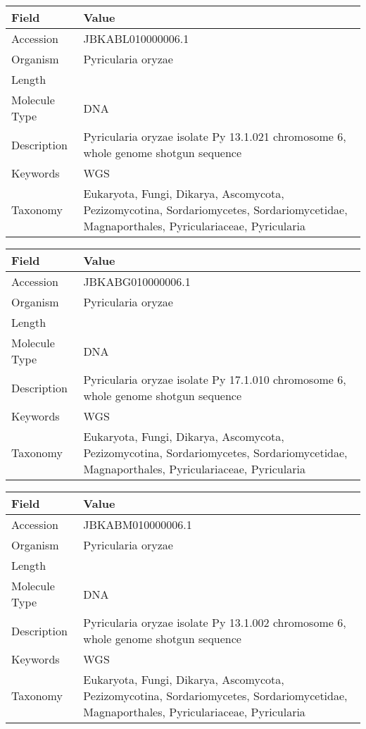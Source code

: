 \documentclass[10pt]{article}
\begin{document}
{\footnotesize
\begin{longtable}{>{\raggedright\arraybackslash}p{4.5cm} >{\raggedright\arraybackslash}p{11.5cm}}
\textbf{Field} & \textbf{Value} \\
\hline
Accession & JBKABL010000006.1 \\
Organism & Pyricularia oryzae \\
Length & 6041258 \\
Molecule Type & DNA \\
Description & Pyricularia oryzae isolate Py 13.1.021 chromosome 6, whole genome shotgun sequence \\
Keywords & WGS \\
Taxonomy & Eukaryota, Fungi, Dikarya, Ascomycota, Pezizomycotina, Sordariomycetes, Sordariomycetidae, Magnaporthales, Pyriculariaceae, Pyricularia \\
\end{longtable}
}

{\footnotesize
\begin{longtable}{>{\raggedright\arraybackslash}p{4.5cm} >{\raggedright\arraybackslash}p{11.5cm}}
\textbf{Field} & \textbf{Value} \\
\hline
Accession & JBKABG010000006.1 \\
Organism & Pyricularia oryzae \\
Length & 6061630 \\
Molecule Type & DNA \\
Description & Pyricularia oryzae isolate Py 17.1.010 chromosome 6, whole genome shotgun sequence \\
Keywords & WGS \\
Taxonomy & Eukaryota, Fungi, Dikarya, Ascomycota, Pezizomycotina, Sordariomycetes, Sordariomycetidae, Magnaporthales, Pyriculariaceae, Pyricularia \\
\end{longtable}
}

{\footnotesize
\begin{longtable}{>{\raggedright\arraybackslash}p{4.5cm} >{\raggedright\arraybackslash}p{11.5cm}}
\textbf{Field} & \textbf{Value} \\
\hline
Accession & JBKABM010000006.1 \\
Organism & Pyricularia oryzae \\
Length & 5895648 \\
Molecule Type & DNA \\
Description & Pyricularia oryzae isolate Py 13.1.002 chromosome 6, whole genome shotgun sequence \\
Keywords & WGS \\
Taxonomy & Eukaryota, Fungi, Dikarya, Ascomycota, Pezizomycotina, Sordariomycetes, Sordariomycetidae, Magnaporthales, Pyriculariaceae, Pyricularia \\
\end{longtable}
}
\end{document}
